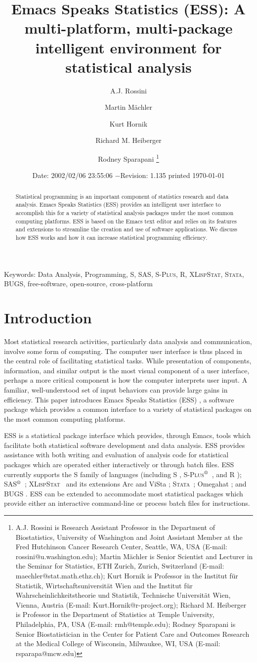 \documentclass{article}
\title{Emacs Speaks Statistics (ESS): A multi-platform, multi-package
intelligent environment for statistical analysis}
\author{A.J. Rossini \and Martin M{\"a}chler \and Kurt Hornik \and Richard
  M. Heiberger \and Rodney Sparapani \footnote{%
    A.J. Rossini is Research Assistant Professor in the Department of
    Biostatistics, University of Washington and Joint Assistant Member at
    the Fred Hutchinson Cancer Research Center, Seattle, WA, USA
    (E-mail: rossini@u.washington.edu);
    Martin M{\"a}chler is Senior Scientist and Lecturer in the Seminar for
    Statistics, ETH Zurich, Zurich, Switzerland
    (E-mail: maechler@stat.math.ethz.ch);
    Kurt Hornik is Professor in the Institut f{\"u}r Statistik,
    Wirtschaftsuniversit{\"a}t Wien and the Institut f{\"u}r
    Wahrscheinlichkeitstheorie und Statistik, Technische Universit{\"a}t
    Wien, Vienna, Austria (E-mail: Kurt.Hornik@r-project.org);
    Richard M. Heiberger is Professor in the Department of Statistics at
    Temple University, Philadelphia, PA, USA (E-mail: rmh@temple.edu);
    Rodney Sparapani is Senior Biostatistician in the Center for Patient
    Care and Outcomes Research at the Medical College of Wisconsin, 
    Milwaukee, WI, USA (E-mail: rsparapa@mcw.edu)}}
\date{$ $Date: 2002/02/06 23:55:06 $ - $Revision: 1.135 $ $\tiny printed \today}
\newif\ifdraft
\renewcommand{\baselinestretch}{1.5}
\newcommand*{\regstrd}{$^{\mbox{\scriptsize{\textregistered}}}$}
\newcommand*{\SAS}{\textsc{SAS}}
\newcommand*{\Splus}{\textsc{S-Plus}}
\newcommand*{\XLispStat}{\textsc{XLispStat}}
\newcommand*{\Stata}{\textsc{Stata}}
\begin{document}

\ifdraft
\setcounter{page}{0}
\tableofcontents
\fi

\maketitle

\ifdraft{}%
\else%
 \renewcommand{\baselinestretch}{1.5}
\fi

\begin{abstract}
  Statistical programming is an important component of statistics
  research and data analysis.  Emacs Speaks Statistics (ESS) provides
  an intelligent user interface to accomplish this for a variety of
  statistical analysis packages under the most common computing
  platforms.  ESS is based on the Emacs text editor and relies on its
  features and extensions to streamline the creation and use of
  software applications.  We discuss how ESS works and how it can
  increase statistical programming efficiency.
\end{abstract}

\noindent Keywords: Data Analysis, Programming, 
S, \SAS, \Splus, R, \XLispStat, \Stata, BUGS, free-software,
open-source, cross-platform

\section{Introduction}
\label{sec:introduction}

Most statistical research activities, particularly data analysis and
communication, involve some form of computing.  The computer user
interface is thus placed in the central role of facilitating
statistical tasks.  While presentation of components, information, and
similar output is the most visual component of a user interface,
perhaps a more critical component is how the computer interprets user
input.  A familiar, well-understood set of input behaviors can provide
large gains in efficiency.  This paper introduces Emacs Speaks
Statistics (ESS) \citep{ESS}, a software package which provides a
common interface to a variety of statistical packages on the most
common computing platforms.

ESS is a statistical package interface which provides, through Emacs,
tools which facilitate both statistical software development and data
analysis.  ESS provides assistance with both writing and evaluation of
analysis code for statistical packages which are operated either
interactively or through batch files.  ESS currently supports the S
family of languages (including S \citep{BecRCW88,ChaJH92,ChaJ98},
\Splus\regstrd\ \citep{Splus}, and R \citep{ihak:gent:1996});
\SAS\regstrd\ \citep{SAS:8}; \XLispStat\ \citep{Tier90} and its
extensions Arc \citep{Cook:Weisberg:1999} and ViSta
\citep{youn:fald:mcfa:1992}; \Stata\ \citep{Stata:6.0}; Omegahat
\citep{DTLang:2000}; and BUGS \citep{BUGS}.  ESS can be extended to
accommodate most statistical packages which provide either an
interactive command-line or process batch files for instructions.
\end{document}
